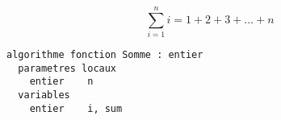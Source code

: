 \documentclass[11pt,a4paper]{article}
\begin{document}
\begin{center}
\begin{equation*}
\sum^{n}_{i = 1} i = 1 + 2 + 3 + \ldots + n
\end{equation*}
\end{center}


\vfillFirst



\begin{table}[h!]
  \centering
  \begin{minipage}{0.59\textwidth}
    \centering
\begin{lstlisting}[style=algorithmique]
algorithme fonction Somme : entier
  parametres locaux
    entier    n
  variables
    entier    i, sum


\end{lstlisting}
\end{minipage}
\end{table}
\end{document}
